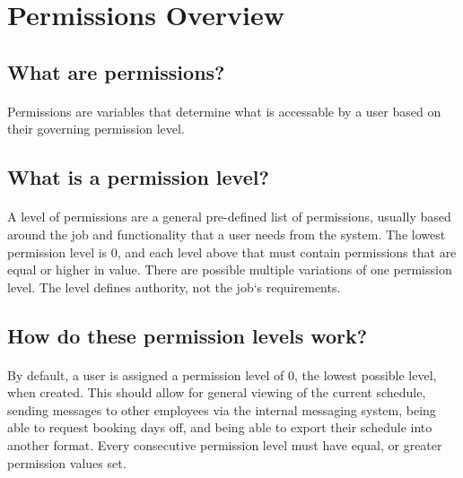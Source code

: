 \documentclass[letterpaper,12pt]{report}
\begin{document}
\section{Permissions Overview}

\subsection*{What are permissions?}
	\paragraph*{}\hspace{0.6cm}Permissions are variables that determine what is accessable by a user based on their governing permission level.

\subsection*{What is a permission level?}
\paragraph*{}\hspace{0.6cm}A level of permissions are a general pre-defined list of permissions, usually based around the job and functionality that a user needs from the system. The lowest permission level is 0, and each level above that must contain permissions that are equal or higher in value. There are possible multiple variations of one permission level. The level defines authority, not the job`s requirements.
\pagebreak
\subsection*{How do these permission levels work?}
\paragraph*{}\hspace{0.6cm}By default, a user is assigned a permission level of 0, the lowest possible level, when created. This should allow for general viewing of the current schedule, sending messages to other employees via the internal messaging system, being able to request booking days off, and being able to export their schedule into another format. Every consecutive permission level must have equal, or greater permission values set.
\end{document}
